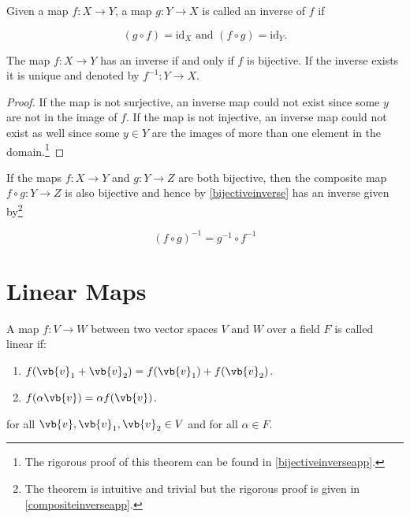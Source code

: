 \documentclass[a4paper,12pt]{report}
\begin{document}
\begin{definition}
Given a map \(f: X \rightarrow Y\), a map \(g: Y \rightarrow X\) is called an inverse of \(f\) if

\begin{equation}
    (g \circ  f) = \mathrm{id}_{X} \text { and } (f \circ g) = \mathrm{id}_{Y}. 
\end{equation}

\end{definition}

\begin{theorem} \label{bijectiveinverse} 
The map \(f: X \rightarrow Y\) has an inverse if and only if \(f\) is bijective. If the inverse exists it is unique and denoted by \(f^{-1} : Y \rightarrow X\). 
\end{theorem}

\begin{proof}
    If the map is not surjective, an inverse map could not exist since some \(y\) are not in the image of \(f\). If the map is not injective, an inverse map could not exist as well since some \(y \in  Y\) are the images of more than one element in the domain.\footnote{The rigorous proof of this theorem can be found in \cref{bijectiveinverseapp}.}
\end{proof}

\begin{theorem}  \label{compositeinversetheo} 
If the maps \(f: X \rightarrow Y\) and \(g: Y \rightarrow Z\) are both bijective, then the composite map \(f \circ g: Y \rightarrow Z\) is also bijective and hence by \cref{bijectiveinverse} has an inverse given by\footnote{The theorem is intuitive and trivial but the rigorous proof is given in \cref{compositeinverseapp}.}

\begin{equation} \label{compositeinverseeq} 
    (f \circ g)^{-1} = g^{-1} \circ f^{-1} 
\end{equation}

\end{theorem}


\section{Linear Maps}

\begin{definition} \label{linearmap} 
A map \(f:V \rightarrow W\) between two vector spaces \(V \text { and }  W\) over a field \(F\) is called linear if:

\begin{enumerate}[label=(\(E\)\arabic*)]
    \item \(f(\vb{v} _{1} + \vb{v} _{2}  ) = f(\vb{v} _{1} ) + f(\vb{v} _{2} )\).
    \item \(f(\alpha \vb{v} ) = \alpha f(\vb{v} )\).
\end{enumerate}

for all \(\vb{v} ,\vb{v} _{1}, \vb{v} _{2}\in V  \) and for all \(\alpha \in  F\). 

\end{definition}
\end{document}
